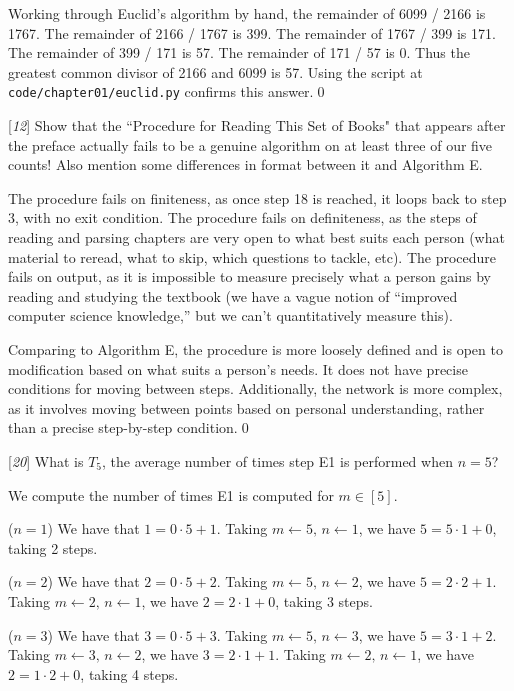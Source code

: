 \sol Working through Euclid's algorithm by hand, the remainder of 6099 / 2166 is 1767. The remainder of 2166 / 1767 is 399. The remainder of 1767 / 399 is 171. The remainder of 399 / 171 is 57. The remainder of 171 / 57 is 0. Thus the greatest common divisor of 2166 and 6099 is 57. Using the script at \verb|code/chapter01/euclid.py| confirms this answer.\qed

 [\textit{12}] Show that the ``Procedure for Reading This Set of Books" that appears after the preface actually fails to be a genuine algorithm on at least three of our five counts! Also mention some differences in format between it and Algorithm E.

\sol The procedure fails on finiteness, as once step 18 is reached, it loops back to step 3, with no exit condition. The procedure fails on definiteness, as the steps of reading and parsing chapters are very open to what best suits each person (what material to reread, what to skip, which questions to tackle, etc). The procedure fails on output, as it is impossible to measure precisely what a person gains by reading and studying the textbook (we have a vague notion of ``improved computer science knowledge,'' but we can't quantitatively measure this).

Comparing to Algorithm E, the procedure is more loosely defined and is open to modification based on what suits a person's needs. It does not have precise conditions for moving between steps. Additionally, the network is more complex, as it involves moving between points based on personal understanding, rather than a precise step-by-step condition.\qed

 [\textit{20}] What is $T_5$, the average number of times step E1 is performed when $n=5$?

\sol We compute the number of times E1 is computed for $m \in [5]$.

($n=1$) We have that $1 = 0\cdot 5 + 1$. Taking $m \leftarrow 5, \, n \leftarrow 1$, we have $5 = 5\cdot 1 + 0$, taking 2 steps.

($n=2$) We have that $2 = 0\cdot 5 + 2$. Taking $m \leftarrow 5, \, n \leftarrow 2$, we have $5 = 2\cdot 2 + 1$. Taking $m \leftarrow 2, \, n \leftarrow 1$, we have $2 = 2\cdot 1 + 0$, taking 3 steps.

($n=3$) We have that $3 = 0\cdot 5 + 3$. Taking $m \leftarrow 5, \, n \leftarrow 3$, we have $5 = 3\cdot 1 + 2$. Taking $m \leftarrow 3, \, n \leftarrow 2$, we have $3 = 2 \cdot 1 + 1$. Taking $m \leftarrow 2, \, n \leftarrow 1$, we have $2 = 1\cdot 2 + 0$, taking 4 steps.

